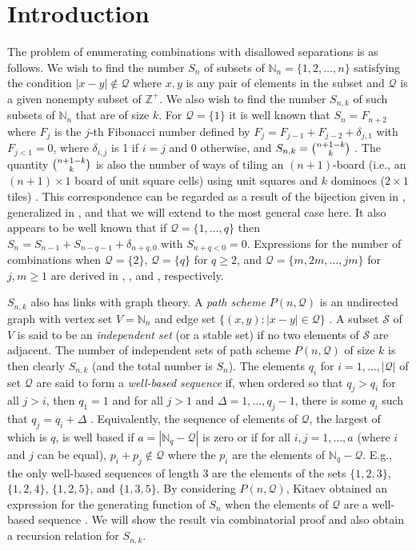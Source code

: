 \documentclass[preprint,3p]{elsarticle}
\newcommand{\abs}[1]{\left\lvert#1\right\rvert}
\providecommand{\Nset}{\mathbb{N}}
\begin{document}
\section{Introduction}
The problem of enumerating combinations with disallowed separations is
as follows. We wish to find the number $S_n$ of subsets of
$\mathbb{N}_n=\{1,2,\ldots,n\}$ satisfying the condition
$\abs{x-y}\notin \mathcal{Q}$ where $x,y$ is any pair of elements in
the subset and $\mathcal{Q}$ is a given nonempty subset of
$\mathbb{Z}^+$. We also wish to find the number $S_{n,k}$ of such
subsets of $\Nset_n$ that are of size $k$.  For $\mathcal{Q}=\{1\}$ it
is well known that $S_n=F_{n+2}$ where $F_j$ is the $j$-th Fibonacci
number defined by $F_{j}=F_{j-1}+F_{j-2}+\delta_{j,1}$ with
$F_{j<1}=0$, where $\delta_{i,j}$ is 1 if $i=j$ and 0 otherwise, and
$S_{n,k}=\tbinom{n+1-k}{k}$ \cite{Kap43}. The quantity
$\tbinom{n+1-k}{k}$ is also the number of ways of tiling an
$(n+1)$-board (i.e., an $(n+1)\times1$ board of unit square cells)
using unit squares and $k$ dominoes ($2\times1$ tiles)
\cite{BQ=03}. This correspondence can be regarded as a result of the
bijection given in \cite{AE22}, generalized in
\cite{All22}, and that we will extend to the most general
case here.  It also appears to be well known that if
$\mathcal{Q}=\{1,\ldots,q\}$ then $S_n=S_{n-1}+S_{n-q-1}+\delta_{n+q,0}$ with
$S_{n+q<0}=0$.  Expressions for the number of combinations when
$\mathcal{Q}=\{2\}$, $\mathcal{Q}=\{q\}$ for $q\geq2$, and
$\mathcal{Q}=\{m,2m,\ldots,jm\}$ for $j,m\geq1$ are derived in
\cite{Kon81}, \cite{Pro83,KL91c,KL91b}, and \cite{MS08,All22},
respectively.

$S_{n,k}$ also has links with graph theory. A \textit{path scheme}
$P(n,\mathcal{Q})$ is an undirected graph with vertex set $V=\Nset_n$
and edge set $\{(x,y):\abs{x-y}\in\mathcal{Q}\}$ \cite{Kit06}. A
subset $\mathcal{S}$ of $V$ is said to be an \textit{independent set}
(or a stable set) if no two elements of $\mathcal{S}$ are
adjacent. The number of independent sets of path scheme
$P(n,\mathcal{Q})$ of size $k$ is then clearly $S_{n,k}$ (and the
total number is $S_n$). The elements $q_i$ for
$i=1,\ldots,\abs{\mathcal{Q}}$ of set $\mathcal{Q}$ are said to form a
\textit{well-based sequence} if, when ordered so that $q_j>q_i$ for
all $j>i$, then $q_1=1$ and for all $j>1$ and $\Delta=1,\ldots,q_j-1$,
there is some $q_i$ such that $q_j=q_i+\Delta$
\cite{Val11,Kit06}. Equivalently, the sequence of elements of
$\mathcal{Q}$, the largest of which is $q$, is well based if
$a=\abs{\Nset_q-\mathcal{Q}}$ is zero or if for all $i,j=1,\ldots,a$
(where $i$ and $j$ can be equal), $p_i+p_j\notin\mathcal{Q}$ where the
$p_i$ are the elements of $\Nset_q-\mathcal{Q}$.  E.g., the only
well-based sequences of length 3 are the elements of the sets
$\{1,2,3\}$, $\{1,2,4\}$, $\{1,2,5\}$, and $\{1,3,5\}$. By considering
$P(n,\mathcal{Q})$, Kitaev obtained an expression for the generating
function of $S_n$ when the elements of $\mathcal{Q}$ are a well-based
sequence \cite{Kit06}. We will show the result via combinatorial proof
and also obtain a recursion relation for $S_{n,k}$.
\end{document}
